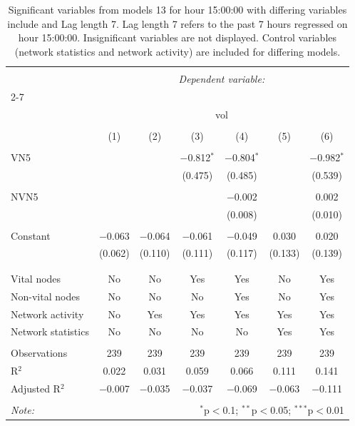
\begin{table}[!htbp] \centering 
  \caption{Significant variables from models 13 for hour 15:00:00 with differing variables include 
                               and Lag length 7. Lag length 7 refers to the past 7 hours regressed on hour 15:00:00. 
                               Insignificant variables are not displayed. 
                               Control variables (network statistics and network activity) are 
                               included for differing models.} 
  \label{Volumemodels1_t_hourlagged2} 
\scriptsize 
\begin{tabular}{@{\extracolsep{5pt}}lcccccc} 
\\[-1.8ex]\hline 
\hline \\[-1.8ex] 
 & \multicolumn{6}{c}{\textit{Dependent variable:}} \\ 
\cline{2-7} 
\\[-1.8ex] & \multicolumn{6}{c}{vol} \\ 
\\[-1.8ex] & (1) & (2) & (3) & (4) & (5) & (6)\\ 
\hline \\[-1.8ex] 
 VN5 &  &  & $-$0.812$^{*}$ & $-$0.804$^{*}$ &  & $-$0.982$^{*}$ \\ 
  &  &  & (0.475) & (0.485) &  & (0.539) \\ 
  & & & & & & \\ 
 NVN5 &  &  &  & $-$0.002 &  & 0.002 \\ 
  &  &  &  & (0.008) &  & (0.010) \\ 
  & & & & & & \\ 
 Constant & $-$0.063 & $-$0.064 & $-$0.061 & $-$0.049 & 0.030 & 0.020 \\ 
  & (0.062) & (0.110) & (0.111) & (0.117) & (0.133) & (0.139) \\ 
  & & & & & & \\ 
\hline \\[-1.8ex] 
Vital nodes & No & No & Yes & Yes & No & Yes \\ 
Non-vital nodes & No & No & No & Yes & No & Yes \\ 
Network activity & No & Yes & Yes & Yes & Yes & Yes \\ 
Network statistics & No & No & No & No & Yes & Yes \\ 
\hline &  &  &  &  &  &  \\ 
Observations & 239 & 239 & 239 & 239 & 239 & 239 \\ 
R$^{2}$ & 0.022 & 0.031 & 0.059 & 0.066 & 0.111 & 0.141 \\ 
Adjusted R$^{2}$ & $-$0.007 & $-$0.035 & $-$0.037 & $-$0.069 & $-$0.063 & $-$0.111 \\ 
\hline 
\hline \\[-1.8ex] 
\textit{Note:}  & \multicolumn{6}{r}{$^{*}$p$<$0.1; $^{**}$p$<$0.05; $^{***}$p$<$0.01} \\ 
\end{tabular} 
\end{table} 
